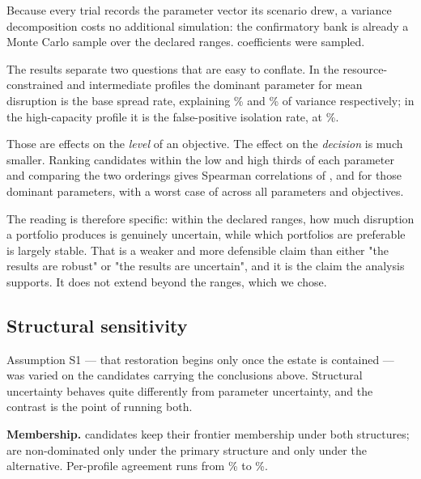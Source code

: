 Because every trial records the parameter vector its scenario drew, a
variance decomposition costs no additional simulation: the confirmatory bank
is already a Monte Carlo sample over the declared ranges.
\SampledParameters{} coefficients were sampled.

The results separate two questions that are easy to conflate. In the
resource-constrained and intermediate profiles the dominant parameter for
mean disruption is the base spread rate, explaining
\SensitivityResourceConstrainedDominantEffect\% and
\SensitivityIntermediateDominantEffect\% of variance respectively; in the
high-capacity profile it is the false-positive isolation rate, at
\SensitivityHighCapacityDominantEffect\%.

Those are effects on the \emph{level} of an objective. The effect on the
\emph{decision} is much smaller. Ranking candidates within the low and high
thirds of each parameter and comparing the two orderings gives Spearman
correlations of \SensitivityResourceConstrainedDominantRankStability{},
\SensitivityIntermediateDominantRankStability{} and
\SensitivityHighCapacityDominantRankStability{} for those dominant
parameters, with a worst case of \SensitivityWorstRankStability{} across all
parameters and objectives.

The reading is therefore specific: within the declared ranges, how much
disruption a portfolio produces is genuinely uncertain, while which
portfolios are preferable is largely stable. That is a weaker and more
defensible claim than either "the results are robust" or "the results are
uncertain", and it is the claim the analysis supports. It does not extend
beyond the ranges, which we chose.

\subsection{Structural sensitivity}

Assumption S1 --- that restoration begins only once the estate is contained
--- was varied on the \StructuralCandidatesTested{} candidates carrying the
conclusions above. Structural uncertainty behaves quite differently from
parameter uncertainty, and the contrast is the point of running both.

\textbf{Membership.} \StructuralPreserved{} candidates keep their frontier
membership under both structures; \StructuralOnlyGated{} are non-dominated
only under the primary structure and \StructuralOnlyParallel{} only under the
alternative. Per-profile agreement runs from \StructuralWorstAgreement\% to
\StructuralBestAgreement\%.

